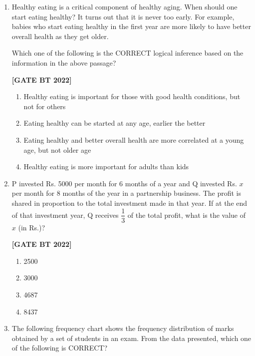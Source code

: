 \documentclass[12pt]{article}
\begin{document}
\begin{enumerate}[leftmargin=2.5em, label=\textbf{Q.\arabic*}., itemsep=2em, resume]

\item Healthy eating is a critical component of healthy aging. When should one start eating healthy? It turns out that it is never too early. For example, babies who start eating healthy in the first year are more likely to have better overall health as they get older.  

Which one of the following is the CORRECT logical inference based on the information in the above passage?

\noindent \textbf{[GATE BT 2022]}
\begin{multicols}{2}
\begin{enumerate}
    \item Healthy eating is important for those with good health conditions, but not for others
    \item Eating healthy can be started at any age, earlier the better
    \item Eating healthy and better overall health are more correlated at a young age, but not older age
    \item Healthy eating is more important for adults than kids
\end{enumerate}
\end{multicols}

\item P invested Rs. 5000 per month for 6 months of a year and Q invested Rs. $x$ per month for 8 months of the year in a partnership business. The profit is shared in proportion to the total investment made in that year.  
If at the end of that investment year, Q receives $\dfrac{1}{3}$ of the total profit, what is the value of $x$ (in Rs.)?

\noindent \textbf{[GATE BT 2022]}
\begin{multicols}{2}
\begin{enumerate}
    \item 2500
    \item 3000
    \item 4687
    \item 8437
\end{enumerate}
\end{multicols}

\item The following frequency chart shows the frequency distribution of marks obtained by a set of students in an exam. From the data presented, which one of the following is CORRECT?


\end{enumerate}
\end{document}
